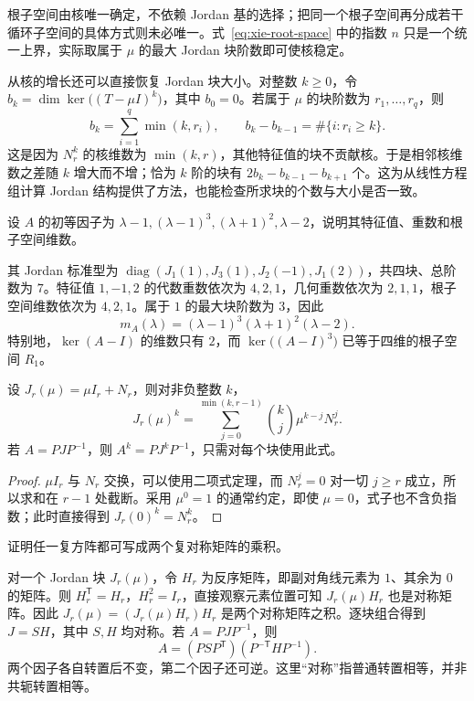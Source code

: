 根子空间由核唯一确定，不依赖 Jordan 基的选择；把同一个根子空间再分成若干循环子空间的具体方式则未必唯一。式~\eqref{eq:xie-root-space} 中的指数 $n$ 只是一个统一上界，实际取属于 $\mu$ 的最大 Jordan 块阶数即可使核稳定。

从核的增长还可以直接恢复 Jordan 块大小。对整数 $k\ge0$，令 $b_k=\dim\ker\bigl((T-\mu I)^k\bigr)$，其中 $b_0=0$。若属于 $\mu$ 的块阶数为 $r_1,\ldots,r_q$，则
\begin{equation}
\label{eq:xie-jordan-nullity-growth}
    b_k=\sum_{i=1}^q\min(k,r_i),\qquad
    b_k-b_{k-1}=\#\{i:r_i\ge k\}.
\end{equation}
这是因为 $N_r^k$ 的核维数为 $\min(k,r)$，其他特征值的块不贡献核。于是相邻核维数之差随 $k$ 增大而不增；恰为 $k$ 阶的块有 $2b_k-b_{k-1}-b_{k+1}$ 个。这为从线性方程组计算 Jordan 结构提供了方法，也能检查所求块的个数与大小是否一致。

\begin{example}
\label{ex:xie-jordan-multiplicity-example}
设 $A$ 的初等因子为 $\lambda-1,(\lambda-1)^3,(\lambda+1)^2,\lambda-2$，说明其特征值、重数和根子空间维数。
\end{example}
\begin{solve}
其 Jordan 标准型为 $\operatorname{diag}(J_1(1),J_3(1),J_2(-1),J_1(2))$，共四块、总阶数为 $7$。特征值 $1,-1,2$ 的代数重数依次为 $4,2,1$，几何重数依次为 $2,1,1$，根子空间维数依次为 $4,2,1$。属于 $1$ 的最大块阶数为 $3$，因此
\[
    m_A(\lambda)=(\lambda-1)^3(\lambda+1)^2(\lambda-2).
\]
特别地，$\ker(A-I)$ 的维数只有 $2$，而 $\ker\bigl((A-I)^3\bigr)$ 已等于四维的根子空间 $R_1$。
\end{solve}

\begin{proposition}
\label{prop:xie-jordan-powers}
设 $J_r(\mu)=\mu I_r+N_r$，则对非负整数 $k$，
\begin{equation}
\label{eq:xie-jordan-powers}
    J_r(\mu)^k=\sum_{j=0}^{\min(k,r-1)}\binom{k}{j}\mu^{k-j}N_r^j.
\end{equation}
若 $A=PJP^{-1}$，则 $A^k=PJ^kP^{-1}$，只需对每个块使用此式。
\end{proposition}
\begin{proof}
$\mu I_r$ 与 $N_r$ 交换，可以使用二项式定理，而 $N_r^j=0$ 对一切 $j\ge r$ 成立，所以求和在 $r-1$ 处截断。采用 $\mu^0=1$ 的通常约定，即使 $\mu=0$，式子也不含负指数；此时直接得到 $J_r(0)^k=N_r^k$。
\end{proof}

\begin{example}
\label{ex:xie-two-symmetric-product}
证明任一复方阵都可写成两个复对称矩阵的乘积。
\end{example}
\begin{solve}
对一个 Jordan 块 $J_r(\mu)$，令 $H_r$ 为反序矩阵，即副对角线元素为 $1$、其余为 $0$ 的矩阵。则 $H_r^{\mathsf T}=H_r$，$H_r^2=I_r$，直接观察元素位置可知 $J_r(\mu)H_r$ 也是对称矩阵。因此 $J_r(\mu)=(J_r(\mu)H_r)H_r$ 是两个对称矩阵之积。逐块组合得到 $J=SH$，其中 $S,H$ 均对称。若 $A=PJP^{-1}$，则
\[
    A=(PSP^{\mathsf T})(P^{-\mathsf T}HP^{-1}).
\]
两个因子各自转置后不变，第二个因子还可逆。这里“对称”指普通转置相等，并非共轭转置相等。
\end{solve}

